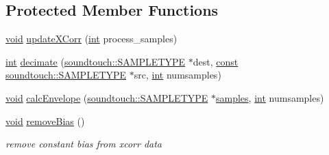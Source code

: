 \subsection*{Protected Member Functions}
\begin{DoxyCompactItemize}
\item 
\hyperlink{sound_8c_ae35f5844602719cf66324f4de2a658b3}{void} \hyperlink{classsoundtouch_1_1_b_p_m_detect_a980b1793f2767c8d84073d76213b0a04}{update\+X\+Corr} (\hyperlink{xmltok_8h_a5a0d4a5641ce434f1d23533f2b2e6653}{int} process\+\_\+samples)
\item 
\hyperlink{xmltok_8h_a5a0d4a5641ce434f1d23533f2b2e6653}{int} \hyperlink{classsoundtouch_1_1_b_p_m_detect_a9557bf0a9304ff1eb85893f3858ea0cd}{decimate} (\hyperlink{namespacesoundtouch_a97cfd29a7abb4d4b2a72f803d5b5850c}{soundtouch\+::\+S\+A\+M\+P\+L\+E\+T\+Y\+PE} $\ast$dest, \hyperlink{getopt1_8c_a2c212835823e3c54a8ab6d95c652660e}{const} \hyperlink{namespacesoundtouch_a97cfd29a7abb4d4b2a72f803d5b5850c}{soundtouch\+::\+S\+A\+M\+P\+L\+E\+T\+Y\+PE} $\ast$src, \hyperlink{xmltok_8h_a5a0d4a5641ce434f1d23533f2b2e6653}{int} numsamples)
\item 
\hyperlink{sound_8c_ae35f5844602719cf66324f4de2a658b3}{void} \hyperlink{classsoundtouch_1_1_b_p_m_detect_a3e9ad82e82846ff56862ed5adc555422}{calc\+Envelope} (\hyperlink{namespacesoundtouch_a97cfd29a7abb4d4b2a72f803d5b5850c}{soundtouch\+::\+S\+A\+M\+P\+L\+E\+T\+Y\+PE} $\ast$\hyperlink{test__w__saw8_8c_a54185623a5a093f671a73e5fba6197a1}{samples}, \hyperlink{xmltok_8h_a5a0d4a5641ce434f1d23533f2b2e6653}{int} numsamples)
\item 
\hyperlink{sound_8c_ae35f5844602719cf66324f4de2a658b3}{void} \hyperlink{classsoundtouch_1_1_b_p_m_detect_af38743b25a2eeb2279423c7cb0a05110}{remove\+Bias} ()
\begin{DoxyCompactList}\small\item\em remove constant bias from xcorr data \end{DoxyCompactList}\end{DoxyCompactItemize}
